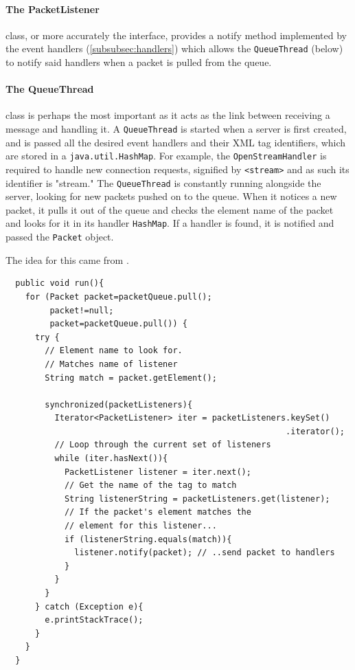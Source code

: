       \paragraph{The PacketListener} class, or more accurately the interface, provides a notify method implemented by the event handlers (\textsection\ref{subsubsec:handlers}) which allows the \verb!QueueThread! (below) to notify said handlers when a packet is pulled from the queue.
      
      \paragraph{The QueueThread} class is perhaps the most important as it acts as the link between receiving a message and handling it. A \verb!QueueThread! is started when a server is first created, and is passed all the desired event handlers and their XML tag identifiers, which are stored in a \verb!java.util.HashMap!. For example, the \verb!OpenStreamHandler! is required to handle new connection requests, signified by \verb!<stream>! and as such its identifier is "stream." The \verb!QueueThread! is constantly running alongside the server, looking for new packets pushed on to the queue. When it notices a new packet, it pulls it out of the queue and checks the element name of the packet and looks for it in its handler \verb!HashMap!. If a handler is found, it is notified and passed the \verb!Packet! object.
      
      The idea for this came from \cite{Shigeoka:2002ys}. \\
      
      \begin{lstlisting}
  public void run(){
    for (Packet packet=packetQueue.pull();
         packet!=null;
         packet=packetQueue.pull()) {
      try {
        // Element name to look for.
        // Matches name of listener
        String match = packet.getElement();

        synchronized(packetListeners){
          Iterator<PacketListener> iter = packetListeners.keySet()
                                                         .iterator();
          // Loop through the current set of listeners
          while (iter.hasNext()){
            PacketListener listener = iter.next();
            // Get the name of the tag to match
            String listenerString = packetListeners.get(listener);
            // If the packet's element matches the
            // element for this listener...
            if (listenerString.equals(match)){
              listener.notify(packet); // ..send packet to handlers
            } 
          } 
        } 
      } catch (Exception e){
        e.printStackTrace();
      }
    } 
  } 
      \end{lstlisting}
      
